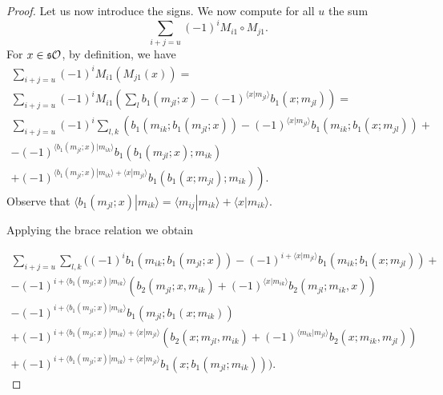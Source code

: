 \documentclass[Thesis.tex]{subfiles}
\begin{document}
\begin{proof}
Let us now introduce the signs. We now compute for all $u$ the sum%
\[\sum_{i+j=u} (-1)^iM_{i1}\circ M_{j1}.\]
For $x\in\mathfrak{s}{\mathcal O}$, by definition, we have
\begin{align*}
\sum_{i+j=u}(-1)^iM_{i1}(M_{j1}(x))=&\\
\sum_{i+j=u}(-1)^iM_{i1}\left(\sum_l b_1(m_{jl};x)-(-1)^{\langle x|m_{jl}\rangle}b_1(x;m_{jl})\right)=&\\
\sum_{i+j=u}(-1)^i\sum_{l,k}\left(b_1(m_{ik}; b_1(m_{jl};x))-(-1)^{\langle x|m_{jl}\rangle}b_1(m_{ik};b_1(x;m_{jl}))+\right.&\\
-(-1)^{\langle b_1(m_{jl};x)|m_{ik}\rangle} b_1(b_1(m_{jl};x);m_{ik})&\\
\left.+(-1)^{\langle b_1(m_{jl};x)|m_{ik}\rangle+\langle x|m_{jl}\rangle}b_1(b_1(x;m_{jl});m_{ik})\right).&
\end{align*}
Observe that $\langle b_1(m_{jl};x)|m_{ik}\rangle=\langle m_{ij}|m_{ik}\rangle+\langle x|m_{ik}\rangle$.

Applying the brace relation we obtain

\begin{align}
\sum_{i+j=u}\sum_{l,k}((-1)^ib_1(m_{ik}; b_1(m_{jl};x))-(-1)^{i+\langle x|m_{jl}\rangle}b_1(m_{ik};b_1(x;m_{jl}))+\nonumber\\
 -(-1)^{i+\langle b_1(m_{jl};x)|m_{ik}\rangle}(b_2(m_{jl};x,m_{ik})+(-1)^{\langle x|m_{ik}\rangle}b_2(m_{jl};m_{ik},x))\nonumber\\
 -(-1)^{i+\langle b_1(m_{jl};x)|m_{ik}\rangle}b_1(m_{jl};b_1(x;m_{ik}))\label{twistedequation}\\
+(-1)^{i+\langle b_1(m_{jl};x)|m_{ik}\rangle+\langle x|m_{jl}\rangle}(b_2(x;m_{jl},m_{ik})+(-1)^{\langle m_{ik}|m_{jl}\rangle}b_2(x;m_{ik},m_{jl}))\nonumber\\
+(-1)^{i+\langle b_1(m_{jl};x)|m_{ik}\rangle+\langle x|m_{jl}\rangle}b_1(x;b_1(m_{jl};m_{ik}))).\nonumber
\end{align}


\end{proof}
\end{document}
